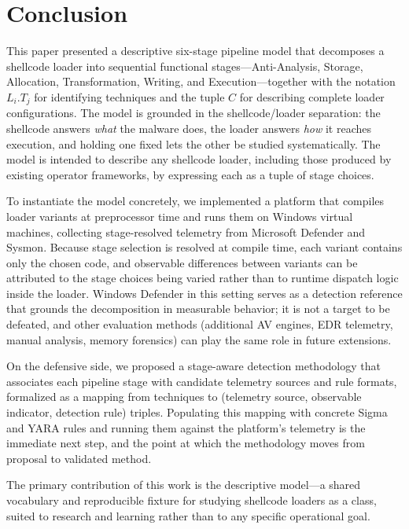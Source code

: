 \section{Conclusion}

This paper presented a descriptive six-stage pipeline model that decomposes a shellcode loader into sequential functional stages---Anti-Analysis, Storage, Allocation, Transformation, Writing, and Execution---together with the notation $L_i.T_j$ for identifying techniques and the tuple $C$ for describing complete loader configurations.
The model is grounded in the shellcode/loader separation: the shellcode answers \emph{what} the malware does, the loader answers \emph{how} it reaches execution, and holding one fixed lets the other be studied systematically.
The model is intended to describe any shellcode loader, including those produced by existing operator frameworks, by expressing each as a tuple of stage choices.

To instantiate the model concretely, we implemented a platform that compiles loader variants at preprocessor time and runs them on Windows virtual machines, collecting stage-resolved telemetry from Microsoft Defender and Sysmon.
Because stage selection is resolved at compile time, each variant contains only the chosen code, and observable differences between variants can be attributed to the stage choices being varied rather than to runtime dispatch logic inside the loader.
Windows Defender in this setting serves as a detection reference that grounds the decomposition in measurable behavior; it is not a target to be defeated, and other evaluation methods (additional AV engines, EDR telemetry, manual analysis, memory forensics) can play the same role in future extensions.

On the defensive side, we proposed a stage-aware detection methodology that associates each pipeline stage with candidate telemetry sources and rule formats, formalized as a mapping from techniques to (telemetry source, observable indicator, detection rule) triples.
Populating this mapping with concrete Sigma and YARA rules and running them against the platform's telemetry is the immediate next step, and the point at which the methodology moves from proposal to validated method.

The primary contribution of this work is the descriptive model---a shared vocabulary and reproducible fixture for studying shellcode loaders as a class, suited to research and learning rather than to any specific operational goal.
